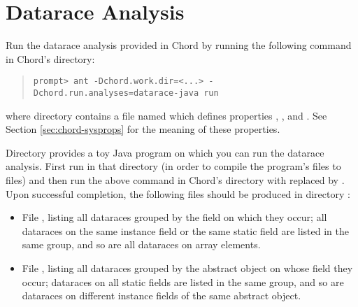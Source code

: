 \section{Datarace Analysis}
\label{sec:datarace}

Run the datarace analysis provided in Chord by running the following command in Chord's  directory:

\begin{quote}
\begin{verbatim}
prompt> ant -Dchord.work.dir=<...> -Dchord.run.analyses=datarace-java run
\end{verbatim}
\end{quote}

\noindent where directory  contains a file named  which
defines properties , , and .
See Section \ref{sec:chord-sysprops} for the meaning of these properties.

Directory  provides a toy Java program on which you can run the datarace
analysis.
First run  in that directory (in order to compile the program's  files to
 files) and then run the above command in Chord's  directory
with  replaced by .
Upon successful completion, the following files should be produced in directory
:

\begin{itemize}
\item
File , listing all dataraces grouped by the field on which they occur; all
dataraces on the same instance field or the same static field are listed in the same group, and so are
all dataraces on array elements.
\item
File , listing all dataraces grouped by the abstract object on whose field they occur;
dataraces on all static fields are listed in the same group, and so are dataraces on different
instance fields of the same abstract object.
\end{itemize}


